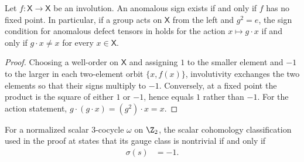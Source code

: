 \begin{lemma}
    \label{thm:mpug_anomalous_involution_sign_iff}
    \leanok
    Let $f\colon\mathsf X\to\mathsf X$ be an involution. An anomalous sign
    exists if and only if $f$ has no fixed point. In particular, if a group
    acts on $\mathsf X$ from the left and $g^2=e$, the sign condition for
    anomalous defect tensors in
    \cite[lines~2979--2981]{FrancoRubio2025MPUGauging} holds for the action
    $x\mapsto g\mathbin{\cdot}x$ if and only if
    $g\mathbin{\cdot}x\neq x$ for every $x\in\mathsf X$.
\end{lemma}

\begin{proof}\leanok
    Choosing a well-order on $\mathsf X$ and assigning $1$ to the smaller
    element and $-1$ to the larger in each two-element orbit $\{x,f(x)\}$,
    involutivity exchanges the two elements so that their signs multiply to
    $-1$. Conversely, at a fixed point the product is the square of either
    $1$ or $-1$, hence equals $1$ rather than $-1$. For the action statement,
    $g\mathbin{\cdot}(g\mathbin{\cdot}x)=(g^2)\mathbin{\cdot}x=x$.
\end{proof}

\begin{lemma}
    \label{thm:mpug_z2_nontrivial_scalar_class}
    \leanok
    For a normalized scalar $3$-cocycle $\omega$ on $\Z_2$, the scalar
    cohomology classification used in the proof at
    \cite[lines~5339--5341]{FrancoRubio2025MPUGauging} states that its gauge
    class is nontrivial if and only if
    \begin{align}
        \sigma(s) & =-1.
        \label{eq:mpug_z2_nontrivial_sigma}
    \end{align}
\end{lemma}

